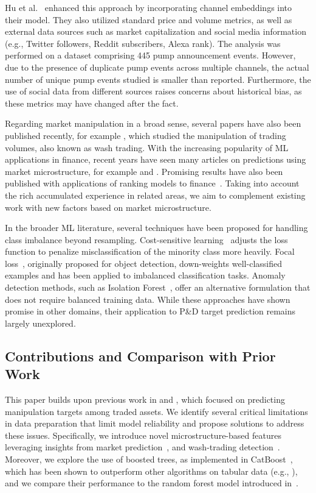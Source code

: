 \documentclass{ieeeaccess}
\begin{document}
Hu et al.~\cite{hu2023sequence} enhanced this approach by incorporating channel embeddings into their model. They also utilized standard price and volume metrics, as well as external data sources such as market capitalization and social media information (e.g., Twitter followers, Reddit subscribers, Alexa rank). The analysis was performed on a dataset comprising 445 pump announcement events. However, due to the presence of duplicate pump events across multiple channels, the actual number of unique pump events studied is smaller than reported. Furthermore, the use of social data from different sources raises concerns about historical bias, as these metrics may have changed after the fact.

Regarding market manipulation in a broad sense, several papers have also been published recently, for example \cite{cong_washtrading_2023}, which studied the manipulation of trading volumes, also known as wash trading. With the increasing popularity of ML applications in finance, recent years have seen many articles on predictions using market microstructure, for example \cite{albers_frag_2022} and \cite{ntakaris_midprice_2022}. Promising results have also been published with applications of ranking models to finance~\cite{poh_ltr}. Taking into account the rich accumulated experience in related areas, we aim to complement existing work with new factors based on market microstructure.

In the broader ML literature, several techniques have been proposed for handling class imbalance beyond resampling. Cost-sensitive learning~\cite{elkan2001cost} adjusts the loss function to penalize misclassification of the minority class more heavily. Focal loss~\cite{lin2017focal}, originally proposed for object detection, down-weights well-classified examples and has been applied to imbalanced classification tasks. Anomaly detection methods, such as Isolation Forest~\cite{liu2008isolation}, offer an alternative formulation that does not require balanced training data. While these approaches have shown promise in other domains, their application to P\&D target prediction remains largely unexplored.


\subsection{Contributions and Comparison with Prior Work}

This paper builds upon previous work in \cite{pd_anatomy} and \cite{hu2023sequence}, which focused on predicting manipulation targets among traded assets. We identify several critical limitations in data preparation that limit model reliability and propose solutions to address these issues. Specifically, we introduce novel microstructure-based features leveraging insights from market prediction~\cite{albers_frag_2022}, \cite{ntakaris_midprice_2022} and wash-trading detection~\cite{cong_washtrading_2023}. Moreover, we explore the use of boosted trees, as implemented in CatBoost~\cite{catboost}, which has been shown to outperform other algorithms on tabular data (e.g., \cite{grinsztajn_2022}), and we compare their performance to the random forest model introduced in~\cite{random_forest_2001}.
\end{document}
